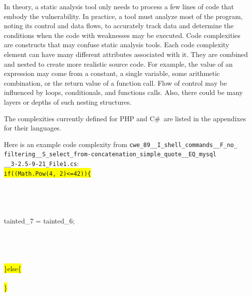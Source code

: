 \documentclass[12pt]{article}
\newcommand{\CSharp}{C{\fontseries{b}\selectfont\#}}
\begin{document}
In theory, a static analysis tool only needs to process a few lines of
code that
embody the vulnerability. In practice, a tool must analyze most 
of the program,
noting its control and data flows, to accurately track data and
determine the
conditions when the code with weaknesses may be executed.
Code complexities are constructs that may confuse static 
analysis tools.  
Each code complexity element can have many different attributes
associated with it.
They are combined and nested to create more realistic source code.
For example, the value 
of an expression may come from a constant, a single variable, 
some arithmetic 
combination, or the return value of a function call.  
Flow of control may be
influenced by loops, conditionals, and functions calls.  
Also, there could be many 
layers or depths of such nesting structures.  

The complexities currently defined for PHP
and \CSharp\ are listed in the appendixes for their languages.

Here is an example code complexity from \verb|cwe_89__I_shell_commands__F_no_|\\ 
\verb|filtering__S_select_from-concatenation_simple_quote__EQ_mysql| \\
\verb|__3-2.5-9-21_File1.cs|: \\
{\texttt
{\colorbox{yellow}{if((Math.Pow(4, 2)<=42))\{}}\\
\\
\\
\\
\\
\hspace*{6em}tainted\_7 = tainted\_6;\\
\\
\\
\\              
\\
{\colorbox{yellow}{\}else\{}}\\
\\
{\colorbox{yellow}{\}}}
}
\end{document}
